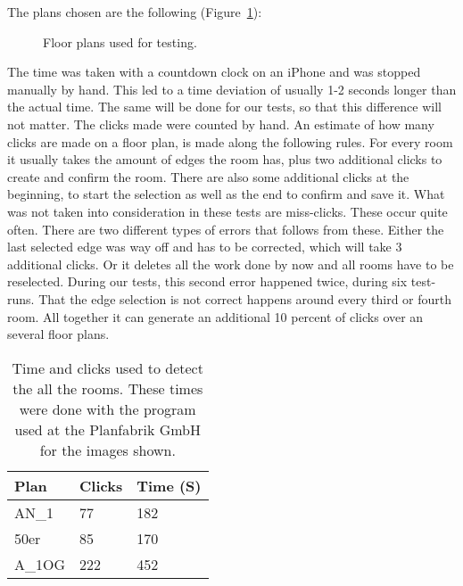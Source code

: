The plans chosen are the following (Figure~\ref{fig:FloorPlansForTesting}):

\begin{figure}[h!]
	\centering
	\hfill
	\hfill
	\caption{Floor plans used for testing.}
	\label{fig:FloorPlansForTesting}
\end{figure}

The time was taken with a countdown clock on an iPhone and was stopped manually by hand. This led to a time deviation of usually 1-2 seconds longer than the actual time. The same will be done for our tests, so that this difference will not matter. The clicks made were counted by hand.
An estimate of how many clicks are made on a floor plan, is made along the following rules. For every room it usually takes the amount of edges the room has, plus two additional clicks to create and confirm the room. There are also some additional clicks at the beginning, to start the selection as well as the end to confirm and save it.
What was not taken into consideration in these tests are miss-clicks. These occur quite often. There are two different types of errors that follows from these. Either the last selected edge was way off and has to be corrected, which will take 3 additional clicks. Or it deletes all the work done by now and all rooms have to be reselected. During our tests, this second error happened twice, during six test-runs. That the edge selection is not correct happens around every third or fourth room. All together it can generate an additional 10 percent of clicks over an several floor plans.

\begin{table}[H]
	\centering
	\begin{tabular}{@{}lll@{}}
		\toprule
		Plan          & Clicks & Time (S) \\ \midrule
		AN\_1         & 77     & 182 \\
		50er          & 85     & 170  \\
		A\_1OG        & 222    & 452 \\ \bottomrule
	\end{tabular}
\caption{Time and clicks used to detect the all the rooms. These times were done with the program used at the Planfabrik GmbH for the images shown. }
\end{table}

